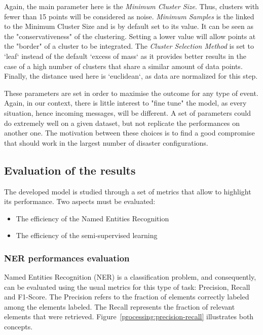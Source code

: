 Again, the main parameter here is the \textit{Minimum Cluster Size}.
Thus, clusters with fewer than 15 points will be considered as noise.
\textit{Minimum Samples} is the linked to the Minimum Cluster Size and is by default
set to its value.
It can be seen as the "conservativeness" of the clustering.
Setting a lower value will allow points at the "border" of a cluster to be integrated.
The \textit{Cluster Selection Method} is set to `leaf` instead of the default `excess of mass`
as it provides better results in the case of a high number of clusters that share a similar
amount of data points.
Finally, the distance used here is `euclidean`, as data are normalized for this step.

These parameters are set in order to maximise the outcome for any type of event.
Again, in our context, there is little interest to "fine tune" the model, as every
situation, hence incoming messages, will be different.
A set of parameters could do extremely well on a given dataset, but not replicate the
performances on another one.
The motivation between these choices is to find a good compromise that should work in
the largest number of disaster configurations.

\subsection{Evaluation of the results}
The developed model is studied through a set of metrics that allow to highlight its performance.
Two aspects must be evaluated:

\begin{itemize}
    \item The efficiency of the Named Entities Recognition
    \item The efficiency of the semi-supervised learning
\end{itemize}

\subsubsection{NER performances evaluation}
Named Entities Recognition (NER) is a classification problem, and consequently, can be evaluated
using the usual metrics for this type of task: Precision, Recall and F1-Score.
The Precision refers to the fraction of elements correctly labeled among the elements labeled.
The Recall represents the fraction of relevant elements that were retrieved.
Figure~\ref{processing:precision-recall} illustrates both concepts.

